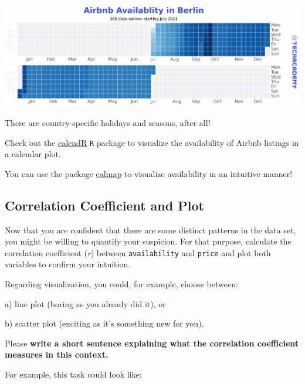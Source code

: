 \documentclass[
  11pt,
]{article}
\newenvironment{tips}[1]
  {
  \begin{itemize}
  \footnotesize
  \renewcommand{\labelitemi}{
    \raisebox{-.7\height}[0pt][0pt]{
      {\setkeys{Gin}{width=3em,keepaspectratio}
        \texttt{[image: images/\#1.png]}}
    }
  }
  \setlength{\fboxsep}{1em}
  \begin{rbox}
  \item
  }
  {
  \end{rbox}
  \end{itemize}
  }
\newenvironment{tipsp}[1]
  {
  \begin{itemize}
  \footnotesize
  \renewcommand{\labelitemi}{
    \raisebox{-.7\height}[0pt][0pt]{
      {\setkeys{Gin}{width=3em,keepaspectratio}
        \texttt{[image: images/\#1.png]}}
    }
  }
  \setlength{\fboxsep}{1em}
  \begin{pbox}
  \item
  }
  {
  \end{pbox}
  \end{itemize}
  }
\begin{document}
\begin{center}\includegraphics[width=1\linewidth]{plot/01_python/calendar} \end{center}

There are country-specific holidays and seasons, after all!

\begin{tips}r
Check out the \href{https://r-coder.com/calendar-plot-r/}{calendR} \texttt{R} package to visualize the availability of Airbnb listings in a calendar plot.

\end{tips}

\begin{tipsp}p
You can use the package \href{https://pythonhosted.org/calmap/}{calmap} to visualize availability in an intuitive manner!

\end{tipsp}

\hypertarget{correlation-coefficient-and-plot}{%
\subsection{Correlation Coefficient and Plot}\label{correlation-coefficient-and-plot}}

Now that you are confident that there are some distinct patterns in the data set, you might be willing to quantify your suspicion.
For that purpose, calculate the correlation coefficient (\emph{r}) between \texttt{availability} and \texttt{price} and plot both variables to confirm your intuition.

Regarding visualization, you could, for example, choose between:

a) line plot (boring as you already did it), or

b) scatter plot (exciting as it's something new for you).

Please \textbf{write a short sentence explaining what the correlation coefficient measures in this context.}

For example, this task could look like:
\end{document}
